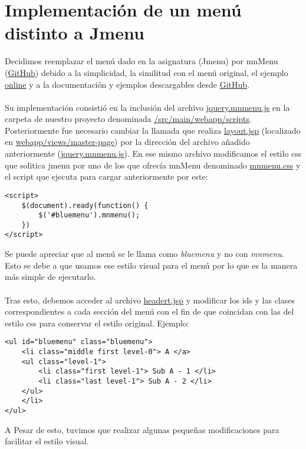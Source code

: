 \documentclass{scrartcl}
\begin{document}
\section{Implementación de un menú distinto a Jmenu}
Decidimos reemplazar el menú dado en la asignatura (Jmenu) por mnMenu (\href{https://github.com/manusa/mnmenu}{GitHub}) debido a la simplicidad, la similitud con el menú original, el ejemplo \href{http://www.marcnuri.com/en/content/mnmenu-dropdown-jquery-menu}{online} y a la documentación y ejemplos descargables desde \href{https://github.com/manusa/mnmenu}{GitHub}.
\\
\\
Su implementación consistió en la inclusión del archivo \href{https://github.com/manusa/mnmenu/blob/master/src/jquery.mnmenu.js}{jquery.mnmenu.js} en la carpeta de nuestro proyecto denominada \href{https://github.com/DPIRPSG/DP1Entrega/tree/master/L01Workspace/Getting-Started-Menu/src/main/webapp/scripts}{/src/main/webapp/scripts}. Posteriormente fue necesario cambiar la llamada que realiza \href{https://github.com/DPIRPSG/DP1Entrega/blob/master/L01Workspace/Getting-Started-Menu/src/main/webapp/views/master-page/layout.jsp}{layout.jsp} (localizado en \href{https://github.com/DPIRPSG/DP1Entrega/blob/master/L01Workspace/Getting-Started-Menu/src/main/webapp/views/master-page/}{webapp/views/master-page}) por la dirección del archivo añadido anteriormente (\href{https://github.com/DPIRPSG/DP1Entrega/tree/master/L01Workspace/Getting-Started-Menu/src/main/webapp/scripts/jquery.mnmenu.js}{jquery.mnmenu.js}).
En ese mismo archivo modificamos el estilo css que solitica jmenu por uno de los que ofrecía mnMenu denominado \href{https://github.com/DPIRPSG/DP1Entrega/blob/Item5-6/L01Workspace/Getting-Started-Menu/src/main/webapp/styles/mnmenu.css}{mnmenu.css} y el script que ejecuta para cargar anteriormente por este:
\begin{lstlisting}[frame=single]
<script>
	$(document).ready(function() {
		$('#bluemenu').mnmenu();
	})
</script>
\end{lstlisting}
Se puede apreciar que al menú se le llama como \textit{bluemenu} y no con \textit{mnmenu}. Esto se debe a que usamos ese estilo visual para el menú por lo que es la manera más simple de ejecutarlo.
\\
\\
Tras esto, debemos acceder al archivo \href{https://github.com/DPIRPSG/DP1Entrega/blob/master/L01Workspace/Getting-Started-Menu/src/main/webapp/views/master-page/header.jsp}{headert.jsp} y modificar los ids y las clases correspondientes a cada sección del menú con el fin de que coincidan con las del estilo css para conservar el estilo original. Ejemplo:
\begin{lstlisting}[frame=single]
<ul id="bluemenu" class="bluemenu"> 
	<li class="middle first level-0"> A </a>
	<ul class="level-1">
		<li class="first level-1"> Sub A - 1 </li>
		<li class="last level-1"> Sub A - 2 </li>					
	</ul>
	</li>
</ul>
\end{lstlisting}



A Pesar de esto, tuvimos que realizar algunas pequeñas modificaciones para facilitar el estilo visual.
\end{document}
